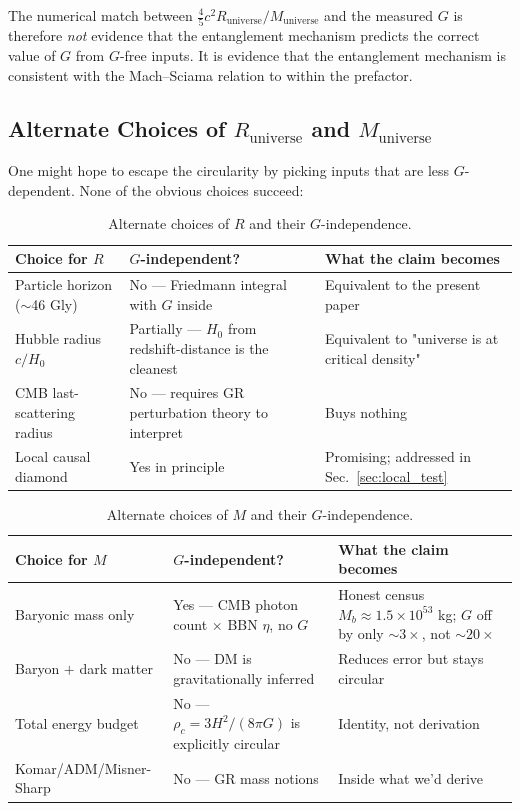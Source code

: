 \documentclass[11pt,letterpaper]{article}
\newcommand{\Runiv}{R_{\mathrm{universe}}}
\newcommand{\Muniv}{M_{\mathrm{universe}}}
\begin{document}
The numerical match between $\frac{4}{5} c^2 \Runiv/\Muniv$ and the
measured $G$ is therefore \emph{not} evidence that the entanglement
mechanism predicts the correct value of $G$ from $G$-free inputs. It
is evidence that the entanglement mechanism is consistent with the
Mach--Sciama relation to within the prefactor.

\subsection{Alternate Choices of $\Runiv$ and $\Muniv$}

One might hope to escape the circularity by picking inputs that are
less $G$-dependent. None of the obvious choices succeed:

\begin{table}[H]
  \centering
  \caption[Alternate choices of R and their G-independence.]{Alternate choices of $R$ and their $G$-independence.}
  \label{tab:R_choices}
  \begin{tabular}{p{4.4cm}p{3.4cm}p{6cm}}
    \toprule
    Choice for $R$ & $G$-independent? & What the claim becomes \\
    \midrule
    Particle horizon ($\sim$46 Gly) & No --- Friedmann integral with $G$ inside & Equivalent to the present paper \\
    Hubble radius $c/H_0$ & Partially --- $H_0$ from redshift-distance is the cleanest & Equivalent to "universe is at critical density" \\
    CMB last-scattering radius & No --- requires GR perturbation theory to interpret & Buys nothing \\
    Local causal diamond & Yes in principle & Promising; addressed in Sec.~\ref{sec:local_test} \\
    \bottomrule
  \end{tabular}
\end{table}

\begin{table}[H]
  \centering
  \caption[Alternate choices of M and their G-independence.]{Alternate choices of $M$ and their $G$-independence.}
  \label{tab:M_choices}
  \begin{tabular}{p{4.4cm}p{3.4cm}p{6cm}}
    \toprule
    Choice for $M$ & $G$-independent? & What the claim becomes \\
    \midrule
    Baryonic mass only & Yes --- CMB photon count $\times$ BBN $\eta$, no $G$ & Honest census $M_b \approx 1.5\times10^{53}$ kg; $G$ off by only $\sim 3\times$, not $\sim 20\times$ \\
    Baryon $+$ dark matter & No --- DM is gravitationally inferred & Reduces error but stays circular \\
    Total energy budget & No --- $\rho_c = 3H^2/(8\pi G)$ is explicitly circular & Identity, not derivation \\
    Komar/ADM/Misner-Sharp & No --- GR mass notions & Inside what we'd derive \\
    \bottomrule
  \end{tabular}
\end{table}
\end{document}
